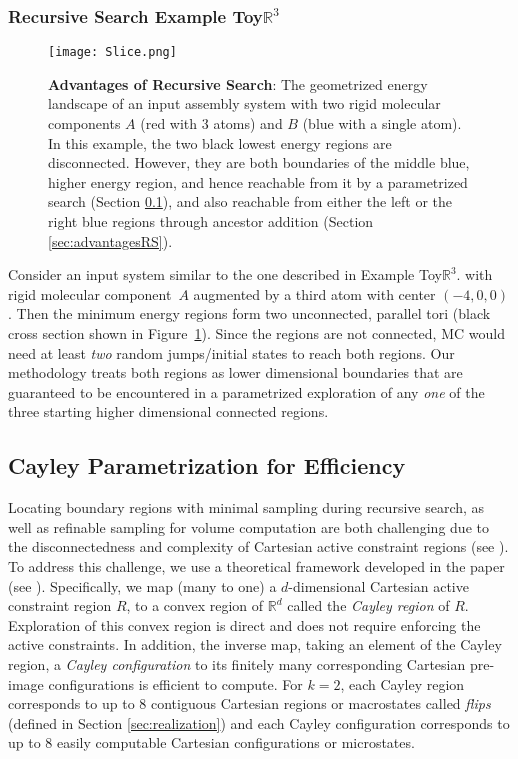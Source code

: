 \documentclass[]{article}
\newcommand{\figref}[1]{Figure~\ref{#1}}
\newcommand{\rmc}{rigid molecular component}
\newcommand{\toythreed}{Toy$\mathbb{R}^3$}
\newcommand{\rahul}[1]{\color{black}{#1}\color{black}}
\begin{document}
\subsubsection{Recursive Search Example \toythreed}
\label{sec:CartesianDisconnectedness}
\begin{figure}[htpb]
\centering
\texttt{[image: Slice.png]}
\caption{\scriptsize \textbf{Advantages of Recursive Search}:
The geometrized energy landscape of an input assembly system with two \rmc s 
$A$ (red with 3 atoms) and $B$ (blue with a single atom). In this example, 
the two black lowest energy regions are disconnected. However, they are both 
boundaries of the middle blue, higher energy region, and hence reachable from 
it by a parametrized search (Section \ref{sec:convexification}), and also 
reachable from either the left or the right blue regions through
ancestor addition (Section \ref{sec:advantagesRS}).
}
\label{fig:slice} 
\end{figure}
Consider an input system similar to the one described in Example \toythreed.
with \rmc\ $A$ augmented by a third atom with center $(-4,0,0)$. Then the
minimum energy regions form two unconnected, parallel tori (black cross section shown in 
\figref{fig:slice}). Since the regions are not connected, MC would need at
least \emph{two} random jumps/initial states to reach both regions. Our
methodology treats both regions as lower dimensional boundaries that are
guaranteed to be encountered in a parametrized exploration of any \emph{one} of
the three starting higher dimensional connected regions.
\subsection{Cayley Parametrization for Efficiency}
\label{sec:convexification} 
Locating boundary regions with minimal sampling during recursive search, as
well as refinable sampling for volume computation are both challenging due to
the disconnectedness and complexity of Cartesian active constraint regions (see
\rahul{Section \ref{sec:correspondanceCayleyCart}}). To address this challenge,
we use a theoretical framework developed in the paper\cite{SiGa:2010} (see
\rahul{Section \ref{sec:app:convexity} of the Appendix}). Specifically, we map (many to one) a
$d$-dimensional Cartesian active constraint region $R$, to a convex region of
$\mathbb{R}^d$ called the \emph{Cayley region} of $R$. Exploration of this
convex region is direct and does not require enforcing the active constraints.
In addition, the inverse map, taking an element of the Cayley region, a
\emph{Cayley configuration} to its finitely many corresponding Cartesian
pre-image configurations is efficient to compute. For $k=2$, each Cayley region
corresponds to up to 8 contiguous Cartesian regions or macrostates called
\emph{flips} (defined in Section \ref{sec:realization}) and each Cayley
configuration corresponds to up to 8 easily computable Cartesian configurations
or microstates.
\end{document}
